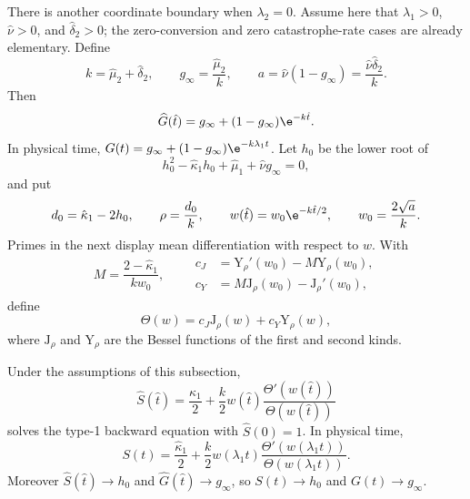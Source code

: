 There is another coordinate boundary when $\lambda_2=0$. Assume here that $\lambda_1>0$, $\hat\nu>0$, and $\hat\delta_2>0$; the zero-conversion and zero catastrophe-rate cases are already elementary. Define
\begin{equation*}
k=\hat\mu_2+\hat\delta_2,
\qquad
g_\infty=\frac{\hat\mu_2}{k},
\qquad
a=\hat\nu(1-g_\infty)
=\frac{\hat\nu\hat\delta_2}{k}.
\end{equation*}
Then
\begin{equation}
\label{eq:G-lambda2-zero}
\widehat G(\hat t)
=g_\infty+(1-g_\infty)\e^{-k\hat t}.
\end{equation}
In physical time, $G(t)=g_\infty+(1-g_\infty)\e^{-k\lambda_1t}$.
Let $h_0$ be the lower root of
\begin{equation*}
h_0^2-\hat\kappa_1h_0+\hat\mu_1+\hat\nu g_\infty=0,
\end{equation*}
and put
\begin{equation*}
d_0=\hat\kappa_1-2h_0,
\qquad
\rho=\frac{d_0}{k},
\qquad
w(\hat t)=w_0\e^{-k\hat t/2},
\qquad
w_0=\frac{2\sqrt a}{k}.
\end{equation*}
Primes in the next display mean differentiation with respect to $w$. With
\begin{equation}
\label{eq:bessel-initial-data}
M=\frac{2-\hat\kappa_1}{kw_0},
\qquad
\begin{aligned}
c_J&=\mathrm Y_\rho'(w_0)-M\mathrm Y_\rho(w_0),\\
c_Y&=M\mathrm J_\rho(w_0)-\mathrm J_\rho'(w_0),
\end{aligned}
\end{equation}
define
\begin{equation*}
\Theta(w)=c_J\mathrm J_\rho(w)+c_Y\mathrm Y_\rho(w),
\end{equation*}
where $\mathrm J_\rho$ and $\mathrm Y_\rho$ are the Bessel functions of the first and second kinds.

\begin{proposition}
\label{prop:lambda2-zero}
Under the assumptions of this subsection,
\begin{equation}
\label{eq:S-lambda2-zero}
\widehat S(\hat t)
=\frac{\hat\kappa_1}{2}
+\frac{k}{2}w(\hat t)
\frac{\Theta'(w(\hat t))}{\Theta(w(\hat t))}
\end{equation}
solves the type-1 backward equation with $\widehat S(0)=1$. In physical time,
\begin{equation*}
S(t)
=\frac{\hat\kappa_1}{2}
+\frac{k}{2}w(\lambda_1t)
\frac{\Theta'(w(\lambda_1t))}{\Theta(w(\lambda_1t))}.
\end{equation*}
Moreover $\widehat S(\hat t)\to h_0$ and $\widehat G(\hat t)\to g_\infty$, so $S(t)\to h_0$ and $G(t)\to g_\infty$.
\end{proposition}

